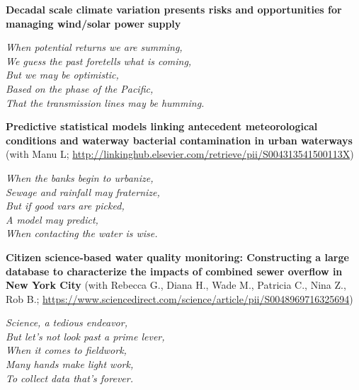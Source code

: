 \documentclass{article}
\begin{document}
\vspace{1.0cm}

\noindent
\textbf{Decadal scale climate variation presents risks and opportunities for managing wind/solar power supply}\\

\vspace{0.25cm}

{\large
\noindent
\textit{When potential returns we are summing,\\
We guess the past foretells what is coming,\\
\null \hspace{0.5cm} But we may be optimistic,\\
\null \hspace{0.5cm} Based on the phase of the Pacific,\\
That the transmission lines may be humming.}
}

\vspace{1.0cm}

\noindent
\textbf{Predictive statistical models linking antecedent meteorological conditions and waterway bacterial contamination in urban waterways} (with Manu L; \url{http://linkinghub.elsevier.com/retrieve/pii/S004313541500113X})\\

\vspace{0.25cm}

{\large
\noindent
\textit{When the banks begin to urbanize,\\
Sewage and rainfall may fraternize,\\
\null \hspace{0.5cm} But if good vars are picked,\\
\null \hspace{0.5cm} A model may predict,\\
When contacting the water is wise.}
}

\vspace{1.0cm}

\noindent
\textbf{Citizen science-based water quality monitoring: Constructing a large database to characterize the impacts of combined sewer overflow in New York City} (with Rebecca G., Diana H., Wade M., Patricia C., Nina Z., Rob B.; \url{https://www.sciencedirect.com/science/article/pii/S0048969716325694})\\

\vspace{0.25cm}

{\large
\noindent
\textit{Science, a tedious endeavor,\\
But let’s not look past a prime lever,\\
\null \hspace{0.5cm} When it comes to fieldwork,\\
\null \hspace{0.5cm} Many hands make light work,\\
To collect data that’s forever.}
}
\end{document}
